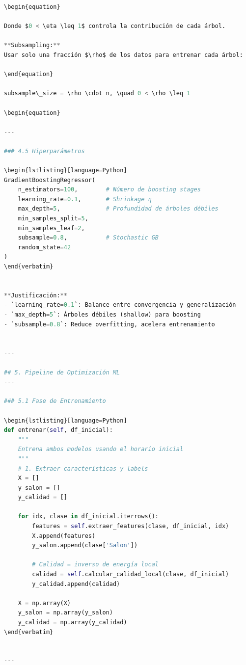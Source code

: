 \begin{itemize}
\begin{itemize}
\begin{itemize}
\begin{itemize}
\begin{itemize}
\begin{itemize}
\begin{enumerate}
\begin{enumerate}
\begin{enumerate}
\begin{enumerate}
\begin{lstlisting}[language=Python]
\begin{equation}

Donde $0 < \eta \leq 1$ controla la contribución de cada árbol.

**Subsampling:**
Usar solo una fracción $\rho$ de los datos para entrenar cada árbol:

\end{equation}

subsample\_size = \rho \cdot n, \quad 0 < \rho \leq 1

\begin{equation}

---

### 4.5 Hiperparámetros

\begin{lstlisting}[language=Python]
GradientBoostingRegressor(
    n_estimators=100,        # Número de boosting stages
    learning_rate=0.1,       # Shrinkage η
    max_depth=5,             # Profundidad de árboles débiles
    min_samples_split=5,
    min_samples_leaf=2,
    subsample=0.8,           # Stochastic GB
    random_state=42
)
\end{verbatim}


**Justificación:**
- `learning_rate=0.1`: Balance entre convergencia y generalización
- `max_depth=5`: Árboles débiles (shallow) para boosting
- `subsample=0.8`: Reduce overfitting, acelera entrenamiento


---

## 5. Pipeline de Optimización ML
---

### 5.1 Fase de Entrenamiento

\begin{lstlisting}[language=Python]
def entrenar(self, df_inicial):
    """
    Entrena ambos modelos usando el horario inicial
    """
    # 1. Extraer características y labels
    X = []
    y_salon = []
    y_calidad = []
    
    for idx, clase in df_inicial.iterrows():
        features = self.extraer_features(clase, df_inicial, idx)
        X.append(features)
        y_salon.append(clase['Salon'])
        
        # Calidad = inverso de energía local
        calidad = self.calcular_calidad_local(clase, df_inicial)
        y_calidad.append(calidad)
    
    X = np.array(X)
    y_salon = np.array(y_salon)
    y_calidad = np.array(y_calidad)
\end{verbatim}


---


\end{lstlisting}
\end{enumerate}
\end{enumerate}
\end{enumerate}
\end{enumerate}
\end{itemize}
\end{itemize}
\end{itemize}
\end{itemize}
\end{itemize}
\end{itemize}
